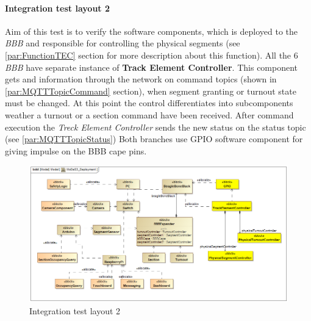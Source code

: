\paragraph{Integration test layout 2}
Aim of this test is to verify the software components, which is deployed to the \textit{BBB} and responsible for controlling the physical segments (see \ref{par:FunctionTEC} section for more description about this function). All the 6 \textit{BBB} have separate instance of \textbf{Track Element Controller}. This component gets and information through the network on command topics (shown in \ref{par:MQTTTopicCommand} section), when segment granting or turnout state must be changed. At this point the control differentiates into subcomponents weather a turnout or a section command have been received. After command execution the \textit{Treck Element Controller} sends the new status on the status topic (see \ref{par:MQTTTopicStatus}) Both branches use GPIO software component for giving impulse on the BBB cape pins.
\begin{figure}[!h]
	\centering
	\includegraphics[width=150mm, keepaspectratio]{figures/testDesign/testLayoutSYSML/MoDeS3_Deployment-test2.png}
	\caption{Integration test layout 2}
	\label{fig:MoDeS3_Deployment-test2}
\end{figure}

